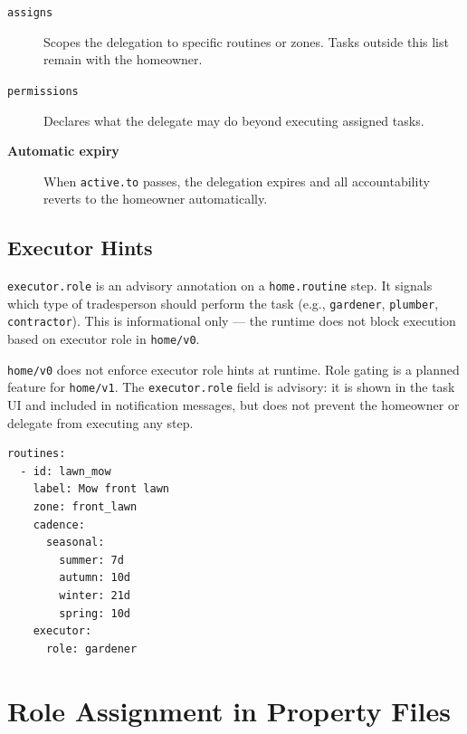 \begin{description}
  \item[\texttt{assigns}] Scopes the delegation to specific routines or zones. Tasks outside
        this list remain with the homeowner.
  \item[\texttt{permissions}] Declares what the delegate may do beyond executing assigned
        tasks.
  \item[\textbf{Automatic expiry}] When \texttt{active.to} passes, the delegation expires
        and all accountability reverts to the homeowner automatically.
\end{description}

\subsection{Executor Hints}

\texttt{executor.role} is an advisory annotation on a \texttt{home.routine} step. It signals
which type of tradesperson should perform the task (e.g., \texttt{gardener},
\texttt{plumber}, \texttt{contractor}). This is informational only --- the runtime does not
block execution based on executor role in \texttt{home/v0}.

\begin{tcolorbox}[colback=yellow!10,colframe=orange!70,title=Note]
  \texttt{home/v0} does not enforce executor role hints at runtime. Role gating is a planned
  feature for \texttt{home/v1}. The \texttt{executor.role} field is advisory: it is shown in
  the task UI and included in notification messages, but does not prevent the homeowner or
  delegate from executing any step.
\end{tcolorbox}

\begin{verbatim}
routines:
  - id: lawn_mow
    label: Mow front lawn
    zone: front_lawn
    cadence:
      seasonal:
        summer: 7d
        autumn: 10d
        winter: 21d
        spring: 10d
    executor:
      role: gardener
\end{verbatim}

\section{Role Assignment in Property Files}
\label{sec:concepts-role-assignment}

